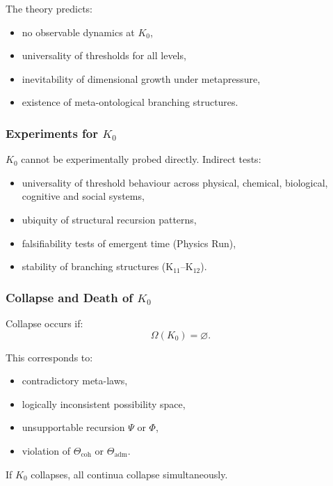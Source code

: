 The theory predicts:
\begin{itemize}
    \item no observable dynamics at $K_0$,
    \item universality of thresholds for all levels,
    \item inevitability of dimensional growth under metapressure,
    \item existence of meta-ontological branching structures.
\end{itemize}

\subsubsection{Experiments for \texorpdfstring{$K_0$}{K_0}}

$K_0$ cannot be experimentally probed directly.  
Indirect tests:
\begin{itemize}
    \item universality of threshold behaviour across physical,
          chemical, biological, cognitive and social systems,
    \item ubiquity of structural recursion patterns,
    \item falsifiability tests of emergent time (Physics Run),
    \item stability of branching structures (K$_{11}$–K$_{12}$).
\end{itemize}

\subsubsection{Collapse and Death of \texorpdfstring{$K_0$}{K_0}}

Collapse occurs if:
\[
\Omega(K_0) = \varnothing.
\]

This corresponds to:
\begin{itemize}
    \item contradictory meta-laws,
    \item logically inconsistent possibility space,
    \item unsupportable recursion $\Psi$ or $\Phi$,
    \item violation of $\Theta_{\mathrm{coh}}$ or $\Theta_{\mathrm{adm}}$.
\end{itemize}

If $K_0$ collapses, all continua collapse simultaneously.

